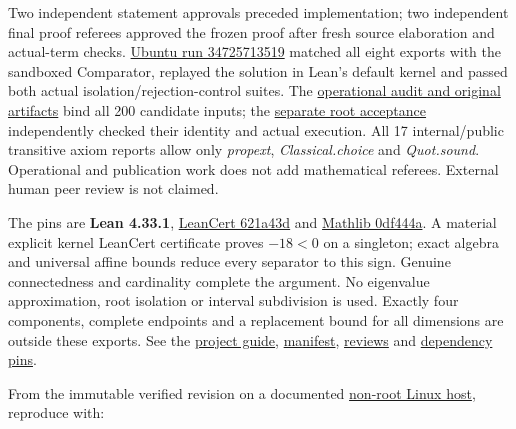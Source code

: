 \documentclass[11pt,a4paper]{article}
\begin{document}
Two independent statement approvals preceded implementation; two
independent final proof referees approved the frozen proof after fresh
source elaboration and actual-term checks.
\href{https://github.com/sgstepaniants/OpenProblemsInNLA/actions/runs/34725713519}{Ubuntu
run 34725713519} matched all eight exports with the sandboxed
Comparator, replayed the solution in Lean's default kernel and passed
both actual isolation/rejection-control suites. The
\href{https://github.com/ajt60gaibb/OpenProblemsInNLA/blob/main/intervals-and-absolute-value-equations/IV-06/lean/verification/linux-2026-09-12}{operational
audit and original artifacts} bind all 200 candidate inputs; the
\href{https://github.com/ajt60gaibb/OpenProblemsInNLA/blob/main/intervals-and-absolute-value-equations/IV-06/lean/verification/root-operational-2026-09-12/ROOT-CHECKS.json}{separate
root acceptance} independently checked their identity and actual
execution. All 17 internal/public transitive axiom reports allow only
\textit{propext}, \textit{Classical.choice} and \textit{Quot.sound}.
Operational and publication work does not add mathematical referees.
External human peer review is not claimed.

The pins are \textbf{Lean 4.33.1},
\href{https://github.com/alerad/leancert/tree/621a43d7cf21f87872392a01e874f2f1dbddc926}{LeanCert
621a43d} and
\href{https://github.com/leanprover-community/mathlib4/tree/0df444a360eaa60ab8c11dca51a86af692955474}{Mathlib
0df444a}. A material explicit kernel LeanCert certificate proves
\(-18<0\) on a singleton; exact algebra and universal affine bounds
reduce every separator to this sign. Genuine connectedness and
cardinality complete the argument. No eigenvalue approximation, root
isolation or interval subdivision is used. Exactly four components,
complete endpoints and a replacement bound for all dimensions are
outside these exports. See the
\href{https://github.com/ajt60gaibb/OpenProblemsInNLA/blob/main/intervals-and-absolute-value-equations/IV-06/lean/README.md}{project
guide},
\href{https://github.com/ajt60gaibb/OpenProblemsInNLA/blob/main/intervals-and-absolute-value-equations/IV-06/lean/formalization.yaml}{manifest},
\href{https://github.com/ajt60gaibb/OpenProblemsInNLA/blob/main/intervals-and-absolute-value-equations/IV-06/lean/reviews}{reviews}
and
\href{https://github.com/ajt60gaibb/OpenProblemsInNLA/blob/main/intervals-and-absolute-value-equations/IV-06/lean/lake-manifest.json}{dependency
pins}.

From the immutable verified revision on a documented
\href{https://github.com/ajt60gaibb/OpenProblemsInNLA/blob/main/tools/lean/HARNESS.md}{non-root
Linux host}, reproduce with:
\end{document}
